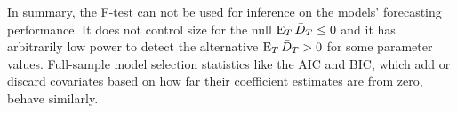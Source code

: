 In summary, the F-test can not be used for inference on the models'
forecasting performance. It does not control size for the null
$\operatorname{E}_T \bar{D}_{T} \leq 0$ and it has arbitrarily low power to detect the
alternative $\operatorname{E}_T \bar{D}_{T} > 0$ for some parameter values. Full-sample
model selection statistics like the AIC and BIC, which add or discard
covariates based on how far their coefficient estimates are from zero,
behave similarly.

